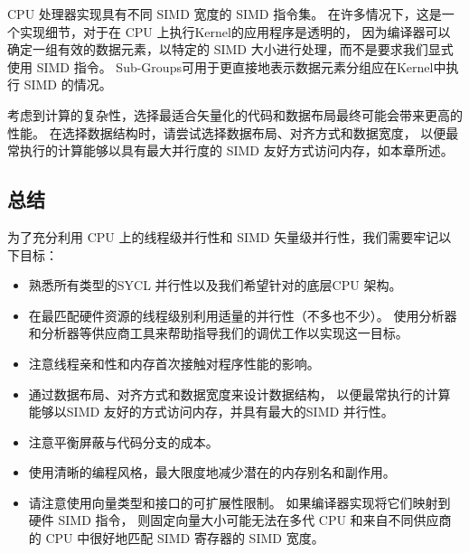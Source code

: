 \begin{remark}
CPU 处理器实现具有不同 SIMD 宽度的 SIMD 指令集。
在许多情况下，这是一个实现细节，对于在 CPU 上执行Kernel的应用程序是透明的，
因为编译器可以确定一组有效的数据元素，以特定的 SIMD 大小进行处理，而不是要求我们显式使用 SIMD 指令。
Sub-Groups可用于更直接地表示数据元素分组应在Kernel中执行 SIMD 的情况。

考虑到计算的复杂性，选择最适合矢量化的代码和数据布局最终可能会带来更高的性能。
在选择数据结构时，请尝试选择数据布局、对齐方式和数据宽度，
以便最常执行的计算能够以具有最大并行度的 SIMD 友好方式访问内存，如本章所述。
\end{remark}

\subsection{总结}
为了充分利用 CPU 上的线程级并行性和 SIMD 矢量级并行性，我们需要牢记以下目标：

\begin{itemize}
	\item 熟悉所有类型的SYCL 并行性以及我们希望针对的底层CPU 架构。

	\item 在最匹配硬件资源的线程级别利用适量的并行性（不多也不少）。 
	使用分析器和分析器等供应商工具来帮助指导我们的调优工作以实现这一目标。

	\item 注意线程亲和性和内存首次接触对程序性能的影响。

	\item 通过数据布局、对齐方式和数据宽度来设计数据结构，
	以便最常执行的计算能够以SIMD 友好的方式访问内存，并具有最大的SIMD 并行性。

	\item 注意平衡屏蔽与代码分支的成本。

	\item 使用清晰的编程风格，最大限度地减少潜在的内存别名和副作用。

	\item 请注意使用向量类型和接口的可扩展性限制。 
	如果编译器实现将它们映射到硬件 SIMD 指令，
	则固定向量大小可能无法在多代 CPU 和来自不同供应商的 CPU 中很好地匹配 SIMD 寄存器的 SIMD 宽度。
\end{itemize}